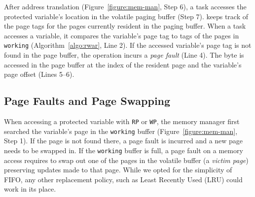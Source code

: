 After address translation (Figure~\ref{figure:mem-man}, Step 6), a task
accesses the protected variable's location in the volatile paging buffer
(Step 7). \sys keeps track of the page tags for
the pages currently resident in the paging buffer. When a task accesses a
variable, it compares the variable's page tag to tags of the pages in {\tt
working} (Algorithm~\ref{algo:rwar}, Line 2).
%
%
If the accessed variable's page tag is not found in the page buffer, the
operation incurs a {\em page fault} (Line 4).
%
The byte is accessed in the page buffer at the index of the resident page and
the variable's page offset (Lines 5--6).


\subsection{Page Faults and Page Swapping}

When accessing a protected variable with \texttt{RP} or \texttt{WP}, the memory
manager first searched the variable's page in the \texttt{working} buffer
(Figure~\ref{figure:mem-man}, Step 1).
If the page is not found there, a page fault is incurred and a new page needs to
be swapped in.
If the \texttt{working} buffer is full, a page fault on a memory access
requires \sys to swap out one of the pages in the volatile buffer (a
\emph{victim page}) preserving updates made to that page.
%
While we opted for the simplicity of FIFO, any other replacement policy, such
as Least Recently Used (LRU) could work in its place.

